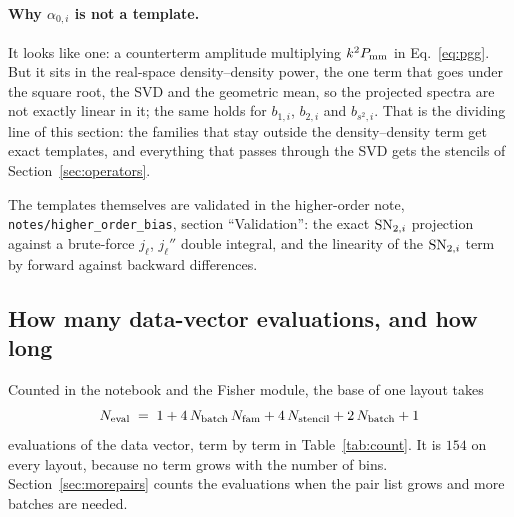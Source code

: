 \documentclass[11pt]{article}
\newcommand{\SNti}{{\rm SN}_{2,i}}
\newcommand{\us}{\_\allowbreak}
\begin{document}
\paragraph{Why $\alpha_{0,i}$ is not a template.}
It looks like one: a counterterm amplitude multiplying
$k^2 P_{\rm mm}$ in Eq.~\eqref{eq:pgg}.  But it sits in the real-space
density--density power, the one term that goes under the square root,
the SVD and the geometric mean, so the projected spectra are not
exactly linear in it; the same holds for $b_{1,i}$, $b_{2,i}$ and
$b_{s^2,i}$.  That is the dividing line of this section: the families
that stay outside the density--density term get exact templates, and
everything that passes through the SVD gets the stencils of
Section~\ref{sec:operators}.

The templates themselves are validated in the higher-order note,
\texttt{notes/higher\us order\us bias}, section ``Validation'': the
exact $\SNti$ projection against a brute-force $j_\ell$, $j_\ell''$
double integral, and the linearity of the $\SNti$ term by forward
against backward differences.

\subsection{How many data-vector evaluations, and how long}
\label{sec:evals}

Counted in the notebook and the Fisher module, the base of one layout
takes
\begin{equation}
  N_{\rm eval} \;=\; 1
  + 4\,N_{\rm batch}\,N_{\rm fam} + 4\,N_{\rm stencil}
  + 2\,N_{\rm batch} + 1
  \label{eq:neval}
\end{equation}
evaluations of the data vector, term by term in Table~\ref{tab:count}.
It is $154$ on every layout, because no term grows with the number of
bins.  Section~\ref{sec:morepairs} counts the evaluations when the
pair list grows and more batches are needed.
\end{document}
